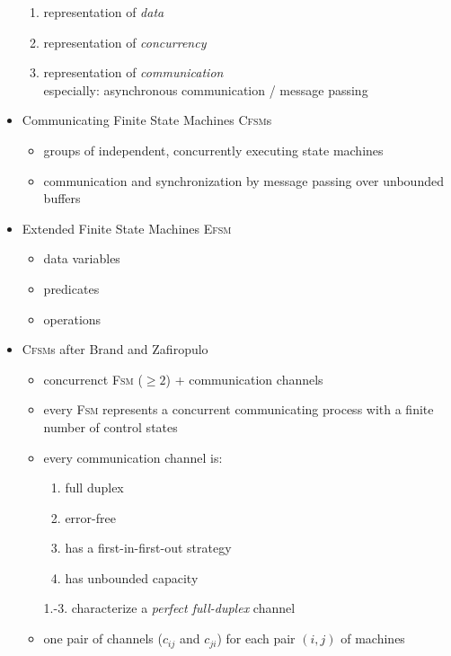 \documentclass[a4paper, 10pt]{article}
\begin{document}
\begin{itemize}
    \begin{enumerate}
        \item representation of \emph{data}
        \item representation of \emph{concurrency}
        \item representation of \emph{communication}\\
        especially: asynchronous communication / message passing
    \end{enumerate}
    \item Communicating Finite State Machines \textsc{Cfsm}s
    \begin{itemize}
        \item groups of independent, concurrently executing state machines
        \item communication and synchronization by message passing over unbounded buffers
    \end{itemize}
    \item Extended Finite State Machines \textsc{Efsm}
    \begin{itemize}
        \item data variables
        \item predicates
        \item operations
    \end{itemize}
    \item \textsc{Cfsm}s after Brand and Zafiropulo
    \begin{shaded}
    \begin{itemize}
        \item concurrenct \textsc{Fsm} ($\geq2$) + communication channels
        \item every \textsc{Fsm} represents a concurrent communicating process with a finite number of control states
        \item every communication channel is:
        \begin{enumerate}
            \item full duplex
            \item error-free
            \item has a first-in-first-out strategy
            \item has unbounded capacity
        \end{enumerate}
        {\tiny 1.-3. characterize a \emph{perfect full-duplex} channel}
        \item one pair of channels ($c_{ij}$ and $c_{ji}$) for each pair $(i,j)$ of machines
    \end{itemize}

\end{shaded}
\end{itemize}
\end{document}
